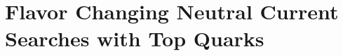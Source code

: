 \documentclass[10pt]{beamer}
\begin{document}
%
%
%
%
%
%

\section{Flavor Changing Neutral Current Searches with Top Quarks}
\end{document}
